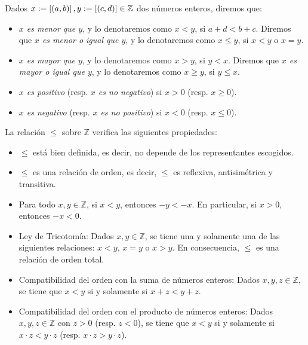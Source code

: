 \begin{definition}
  \rm Dados $x:=\left[\left(a,b\right)\right],y:=\left[\left(c,d\right)\right]\in\mathbb{Z}$ dos números enteros, diremos que:

  \begin{itemize}
    \item \textit{$x$ es menor que $y$}, y lo denotaremos como $x<y$, si $a+d<b+c$. Diremos que \textit{$x$ es menor o igual que $y$}, y lo denotaremos como $x\leq y$, si $x<y$ o $x=y$.
    \item \textit{$x$ es mayor que $y$}, y lo denotaremos como $x>y$, si $y<x$. Diremos que \textit{$x$ es mayor o igual que $y$}, y lo denotaremos como $x\geq y$, si $y\leq x$.
    \item \textit{$x$ es positivo} (resp. \textit{$x$ es no negativo}) si $x>0$ (resp. $x\geq 0$).
    \item \textit{$x$ es negativo} (resp. \textit{$x$ es no positivo}) si $x<0$ (resp. $x\leq 0$).
  \end{itemize}
\end{definition}

\begin{proposition}
  \rm La relación $\leq$ sobre $\mathbb{Z}$ verifica las siguientes propiedades:
  \begin{itemize}
    \item[1.] $\leq$ está bien definida, es decir, no depende de los representantes escogidos.
    \item[2.] $\leq$ es una relación de orden, es decir, $\leq$ es reflexiva, antisimétrica y transitiva.
    \item[3.] Para todo $x,y\in\mathbb{Z}$, si $x<y$, entonces $-y<-x$. En particular, si $x>0$, entonces $-x<0$.
    \item[4.] Ley de Tricotomía: Dados $x,y\in\mathbb{Z}$, se tiene una y solamente una de las siguientes relaciones: $x<y$, $x=y$ o $x>y$. En consecuencia, $\leq$ es una relación de orden total.
    \item[5.] Compatibilidad del orden con la suma de números enteros: Dados $x,y,z\in\mathbb{Z}$, se tiene que $x<y$ si y solamente si $x+z<y+z$.
    \item[6.] Compatibilidad del orden con el producto de números enteros: Dados $x,y,z\in\mathbb{Z}$ con $z>0$ (resp. $z<0$), se tiene que $x<y$ si y solamente si $x\cdot z<y\cdot z$ (resp. $x\cdot z>y\cdot z$).
  \end{itemize}
\end{proposition}

